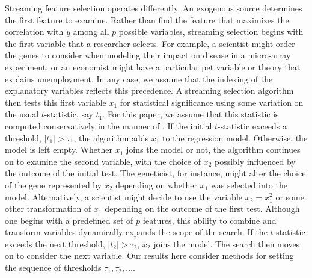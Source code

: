 \documentclass[12pt]{article}
\begin{document}
 
 Streaming feature selection operates differently.  An exogenous source
 determines the first feature to examine.  Rather than find the feature that
 maximizes the correlation with $y$ among all $p$ possible variables, streaming
 selection begins with the first variable that a researcher selects.  For
 example, a scientist might order the genes to consider when modeling their
 impact on disease in a micro-array experiment, or an economist might have a
 particular pet variable or theory that explains unemployment.  In any case, we
 assume that the indexing of the explanatory variables reflects this precedence.
  A streaming selection algorithm then tests this first variable $x_1$ for
 statistical significance using some variation on the usual $t$-statistic, say
 $t_1$.  For this paper, we assume that this statistic is computed
 conservatively in the manner of \citet{fosterstine04:bank}.  If the initial
 $t$-statistic exceeds a threshold, $|t_1| > \tau_1$, the algorithm adds $x_1$
 to the regression model.  Otherwise, the model is left empty.  Whether $x_1$
 joins the model or not, the algorithm continues on to examine the second
 variable, with the choice of $x_2$ possibly influenced by the outcome of the
 initial test.  The geneticist, for instance, might alter the choice of the gene
 represented by $x_2$ depending on whether $x_1$ was selected into the model.
  Alternatively, a scientist might decide to use the variable $x_2 = x_1^2$ or
 some other transformation of $x_1$ depending on the outcome of the first test.
  Although one begins with a predefined set of $p$ features, this ability to
 combine and transform variables dynamically expands the scope of the search.
  If the $t$-statistic exceeds the next threshold, $|t_2| > \tau_2$, $x_2$ joins
 the model.  The search then moves on to consider the next variable.  Our
 results here consider methods for setting the sequence of thresholds $\tau_1,
 \tau_2, \ldots$.
\end{document}
